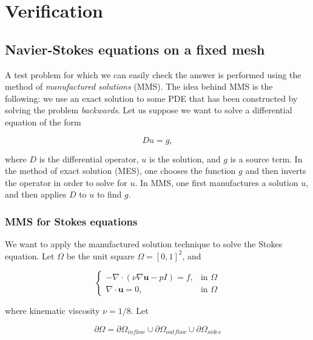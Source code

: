 \documentclass[a4paper,11pt,openright,twoside]{book}
\begin{document}
\chapter{Verification}

\section{Navier-Stokes equations on a fixed mesh}



A test problem for which we can easily check the answer is performed using the method of \textit{manufactured solutions} (MMS). The idea behind MMS is the following: we use an exact solution to some PDE that has been constructed by solving the problem \textit{backwards}. Let us suppose we want to solve a differential equation of the form

\[
Du = g,
\]

where $D$ is the differential operator, $u$ is the solution, and $g$ is a source term. In the method of exact solution (MES), one chooses the function $g$ and then inverts the operator in order to solve for $u$. In MMS, one first manufactures a solution $u$, and then applies $D$ to $u$ to find $g$. \\




\subsection{MMS for Stokes equations}

We want to apply the manufactured solution technique to solve the Stokes equation. Let $\Omega$ be the unit square $\Omega = [0,1]^2$, and

\vspace{0.2cm}
\[
\begin{cases}
- \nabla \cdot (\nu \nabla \mathbf{u} - pI) = f, & \mbox{in } \Omega \\
\nabla \cdot \mathbf{u} = 0, & \mbox{in } \Omega
\end{cases}
\]
\vspace{0.2cm}

where kinematic viscosity $\nu = 1/8$. Let

\[
\partial \Omega = \partial \Omega_{inflow} \cup \partial \Omega_{outflow} \cup \partial \Omega_{sides}
\]
\end{document}
